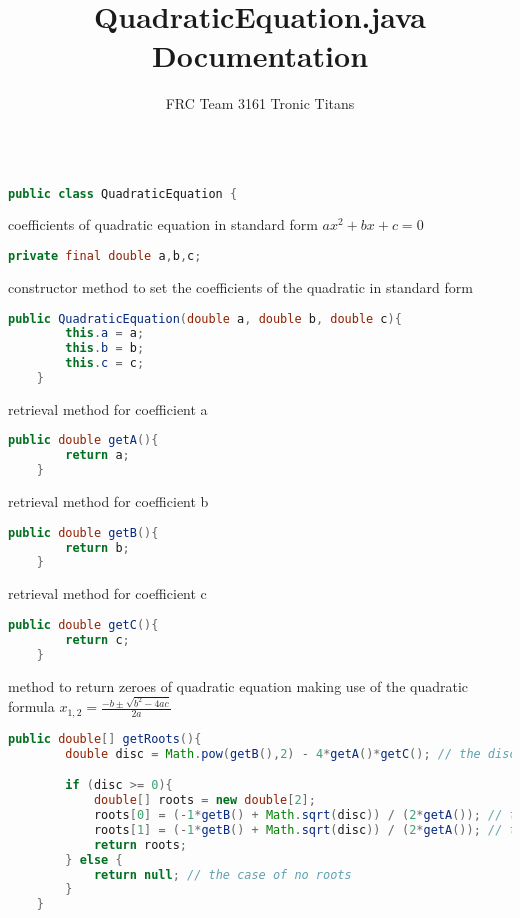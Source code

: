 \documentclass{article}
\title{QuadraticEquation.java Documentation}
\author{FRC Team 3161 Tronic Titans}
\begin{document}
\maketitle


\begin{lstlisting}[language=Java]

public class QuadraticEquation {
\end{lstlisting}

 coefficients of quadratic equation in standard form $ax^2 + bx + c = 0$

\begin{lstlisting}[language=Java]
    private final double a,b,c;

\end{lstlisting}

 constructor method to set the coefficients of the quadratic in standard form

\begin{lstlisting}[language=Java]
    public QuadraticEquation(double a, double b, double c){
        this.a = a;
        this.b = b;
        this.c = c;
    }

\end{lstlisting}

 retrieval method for coefficient a

\begin{lstlisting}[language=Java]
    public double getA(){
        return a;
    }

\end{lstlisting}

 retrieval method for coefficient b

\begin{lstlisting}[language=Java]
    public double getB(){
        return b;
    }

\end{lstlisting}

 retrieval method for coefficient c

\begin{lstlisting}[language=Java]
    public double getC(){
        return c;
    }

\end{lstlisting}

 method to return zeroes of quadratic equation making use of the quadratic formula
 $x_{1,2} = \frac{-b \pm \sqrt{b^2 - 4ac}}{2a}$

\begin{lstlisting}[language=Java]
    public double[] getRoots(){
        double disc = Math.pow(getB(),2) - 4*getA()*getC(); // the discriminant

        if (disc >= 0){
            double[] roots = new double[2];
            roots[0] = (-1*getB() + Math.sqrt(disc)) / (2*getA()); // the root using +
            roots[1] = (-1*getB() + Math.sqrt(disc)) / (2*getA()); // the root using -
            return roots;
        } else {
            return null; // the case of no roots
        }
    }

\end{lstlisting}
\end{document}

